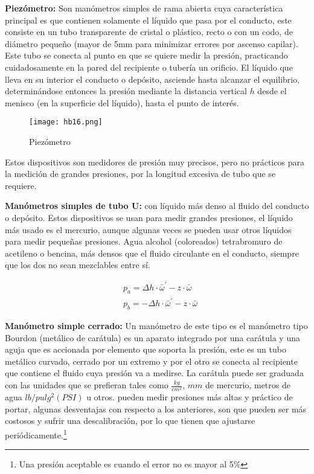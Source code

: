 \textbf{Piezómetro:} Son manómetros simples de rama abierta cuya característica principal es que contienen solamente el líquido que pasa por el conducto, este consiste en un tubo transparente de cristal o plástico, recto o con un codo, de diámetro pequeño (mayor de 5mm para minimizar errores por ascenso capilar). Este tubo se conecta al punto en que se quiere medir la presión, practicando cuidadosamente en la pared del recipiente o tubería un orificio.
El líquido que lleva en su interior el conducto o depósito, asciende hasta alcanzar el equilibrio, determinándose entonces la presión mediante la distancia vertical $h$ desde el menisco (en la superficie del líquido), hasta el punto de interés.

\begin{figure}[h!]
  \centerline{\texttt{[image: hb16.png]}}
  \caption{Piezómetro}
  \label{hb16}
\end{figure}

Estos dispositivos son medidores de presión muy precisos, pero no prácticos para la medición de grandes presiones, por la longitud excesiva de tubo que se requiere.

\textbf{Manómetros simples de tubo U:} con líquido más denso al fluido del conducto o depósito. Estos dispositivos se usan para medir grandes presiones, el líquido más usado es el mercurio, aunque algunas veces se pueden usar otros líquidos para medir pequeñas presiones. Agua alcohol (coloreados)
tetrabromuro de acetileno o bencina, más densos que el fluido circulante en el conducto, siempre que los dos no sean mezclables entre sí.


\begin{align}
    &p_a=\Delta h\cdot \bar{\omega}^{\prime}-z\cdot \bar{\omega}\\
    &p_b=-\Delta h\cdot \bar{\omega}^{\prime}-z\cdot \bar{\omega}
\end{align}

\textbf{Manómetro simple cerrado:} Un manómetro de este tipo es el manómetro tipo Bourdon (metálico de carátula) es un aparato integrado por una carátula y una aguja que es accionada por elemento que soporta la presión, este es un tubo metálico curvado, cerrado por un extremo y por el otro se conecta al recipiente que contiene el fluido cuya presión va a medirse. La carátula puede ser graduada con las unidades que se prefieran tales como $\frac{kg}{cm^2}$, $mm$ de mercurio, metros de agua $lb/pulg^2(PSI)$ u otros. 
pueden medir presiones más altas y práctico de portar, algunas desventajas con respecto a los anteriores, son que pueden ser más costosos y sufrir una descalibración, por lo que tienen que ajustarse periódicamente.\footnote{Una presión aceptable es cuando el error no es mayor al 5\%}


